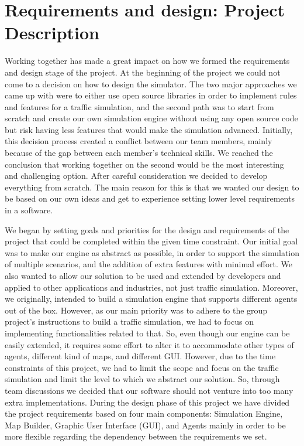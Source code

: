 \documentclass[oneside]{article}
\begin{document}
\section{Requirements and design: Project Description}

\noindent Working together has made a great impact on how we formed the requirements and design stage of the project. At the beginning of the project we could not come to a decision on how to design the simulator. The two major approaches we came up with were to either use open source libraries in order to implement rules and features for a traffic simulation, and the second path was to start from scratch and create our own simulation engine without using any open source code but risk having less features that would make the simulation advanced. Initially, this decision process created a conflict between our team members, mainly because of the gap between each member's technical skills. We reached the conclusion that working together on the second would be the most interesting and challenging option. After careful consideration we decided to develop everything from scratch. The main reason for this is that we wanted our design to be based on our own ideas and get to experience setting lower level requirements in a software. 
\newline

\noindent We began by setting goals and priorities for the design and requirements of the project that could be completed within the given time constraint. Our initial goal was to make our engine as abstract as possible, in order to support the simulation of multiple scenarios, and the addition of extra features with minimal effort. We also wanted to allow our solution to be used and extended by developers and applied to other applications and industries, not just traffic simulation. Moreover, we originally, intended to build a simulation engine that supports different agents out of the box. However, as our main priority was to adhere to the group project's instructions to build a traffic simulation, we had to focus on implementing functionalities related to that. So, even though our engine can be easily extended, it requires some effort to alter it to accommodate other types of agents, different kind of maps, and different GUI. However, due to the time constraints of this project, we had to limit the scope and focus on the traffic simulation and limit the level to which we abstract our solution. So, through team discussions we decided that our software should not venture into too many extra implementations. During the design phase of this project we have divided the project requirements based on four main components: Simulation Engine, Map Builder, Graphic User Interface (GUI), and Agents mainly in order to be more flexible regarding the dependency between the requirements we set. \\
\end{document}
